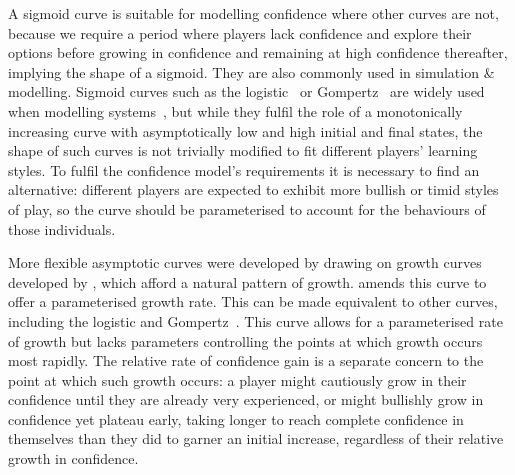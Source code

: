 A sigmoid curve is suitable for modelling confidence where other curves are not,
because we require a period where players lack confidence and explore their
options before growing in confidence and remaining at high confidence
thereafter, implying the shape of a sigmoid. They are also commonly used in
simulation \& modelling. Sigmoid curves such as the
logistic~\cite{verhulst1845loi} or Gompertz~\cite{gompertz1815curve} are widely
used when modelling systems~\cite{werker1997modelling}, but while they fulfil
the role of a monotonically increasing curve with asymptotically low and high
initial and final states, the shape of such curves is not trivially modified to
fit different players' learning styles. To fulfil the confidence model's
requirements it is necessary to find an alternative: different players are
expected to exhibit more bullish or timid styles of play, so the curve should be
parameterised to account for the behaviours of those individuals.

More flexible asymptotic curves were developed by
\citet{richards1959flexiblegrowth}
drawing on growth curves developed by \citet{von1938quantitative}, which afford
a natural pattern of growth. \citeauthor{richards1959flexiblegrowth} amends this
curve to offer a parameterised growth rate. This can be made equivalent to other
curves, including the logistic and Gompertz~\cite{france1984mathematical}. This
curve allows for a parameterised rate of growth but lacks parameters controlling
the points at which growth occurs most rapidly. The relative rate of confidence
gain is a separate concern to the point at which such growth occurs: a player
might cautiously grow in their confidence until they are already very
experienced, or might bullishly grow in confidence yet plateau early, taking
longer to reach complete confidence in themselves than they did to garner an
initial increase, regardless of their relative growth in confidence.

